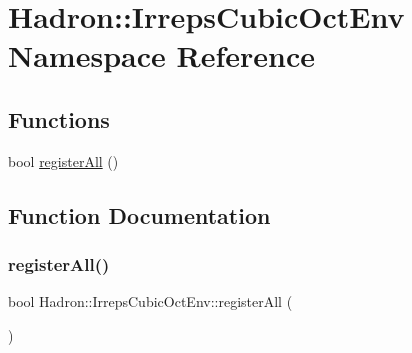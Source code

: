 \hypertarget{namespaceHadron_1_1IrrepsCubicOctEnv}{}\section{Hadron\+:\+:Irreps\+Cubic\+Oct\+Env Namespace Reference}
\label{namespaceHadron_1_1IrrepsCubicOctEnv}
\subsection*{Functions}
\begin{DoxyCompactItemize}
\item 
bool \mbox{\hyperlink{namespaceHadron_1_1IrrepsCubicOctEnv_add350f077e8bf956336f99fe5dc1c29d}{register\+All}} ()
\end{DoxyCompactItemize}


\subsection{Function Documentation}
\mbox{\label{namespaceHadron_1_1IrrepsCubicOctEnv_add350f077e8bf956336f99fe5dc1c29d}} 
\subsubsection{\texorpdfstring{registerAll()}{registerAll()}}
{\footnotesize\ttfamily bool Hadron\+::\+Irreps\+Cubic\+Oct\+Env\+::register\+All (\begin{DoxyParamCaption}{ }\end{DoxyParamCaption})}


